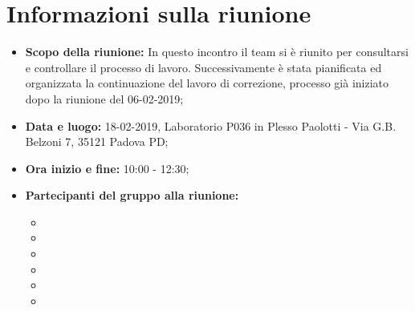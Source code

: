 \clearpage
\section{Informazioni sulla riunione}
\begin{itemize}
	\item \textbf {Scopo della riunione:} In questo incontro il team si è riunito per consultarsi e controllare il processo di lavoro. Successivamente è stata pianificata ed organizzata la continuazione del lavoro di correzione, processo già iniziato dopo la riunione del 06-02-2019;
	\item \textbf {Data e luogo:} 18-02-2019, Laboratorio P036 in Plesso Paolotti - Via G.B. Belzoni 7, 35121 Padova PD;
	\item \textbf {Ora inizio e fine:} 10:00 - 12:30;
	\item \textbf {Partecipanti del gruppo alla riunione:} 
		 \begin{itemize}
			\item \sonia
			\item \luca
			\item \matteo
			\item \alberto
			\item \alessandro
			\item \andrea
		\end{itemize}
\end{itemize}